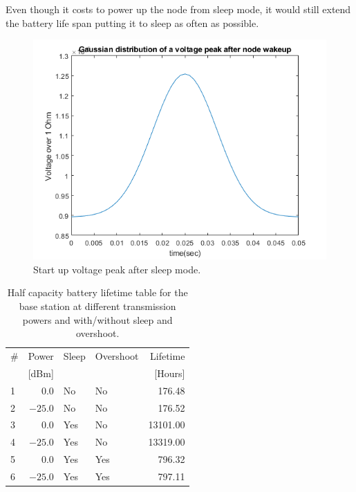 \noindent Even though it costs to power up the node from sleep mode, it would still extend the battery life span putting it to sleep as often as possible.

\begin{figure}[h]
	\centering
	\includegraphics[width=\linewidth]{theory/energyCalculations/fig/gaussianDistributionsOfVoltagePeak.png}
	\caption{Start up voltage peak after sleep mode.}
	\label{fig:gaussianDistributionsOfVoltagePeak}
\end{figure}

\begin{table}[h]
	\centering
	\begin{tabularx}{\linewidth}{|l|r|l|X|r|}
		\hline
		\#	& Power		& Sleep	& Overshoot	& Lifetime	\\
		    & [dBm]		& 		& 		& [Hours]	\\ \hline
		1	& $0.0$		& No	& No	& 176.48	\\ \hline
		2	& $-25.0$	& No	& No	& 176.52	\\ \hline
		3	& $0.0$		& Yes	& No	& 13101.00	\\ \hline
		4	& $-25.0$	& Yes	& No	& 13319.00	\\ \hline
		5	& $0.0$		& Yes	& Yes	& 796.32	\\ \hline
		6	& $-25.0$	& Yes	& Yes	& 797.11	\\ \hline
	\end{tabularx}
	\caption{Half capacity battery lifetime table for the base station at different transmission powers and with/without sleep and overshoot.}
	\label{tab:halfLifetimeBaseStation}
\end{table}